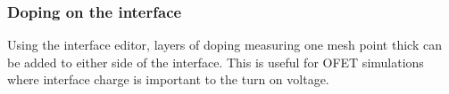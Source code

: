 \subsubsection{Doping on the interface}
Using the interface editor, layers of doping measuring one mesh point thick can be added to either side of the interface.  This is useful for OFET simulations where interface charge is important to the turn on voltage.
